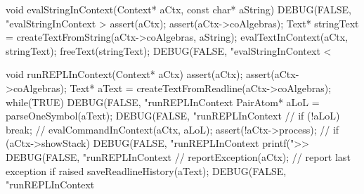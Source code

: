void evalStringInContext(Context* aCtx, const char* aString) {
  DEBUG(FALSE, "evalStringInContext > %
  assert(aCtx);
  assert(aCtx->coAlgebras);
  Text* stringText = createTextFromString(aCtx->coAlgebras, aString);
  evalTextInContext(aCtx, stringText);
  freeText(stringText);
  DEBUG(FALSE, "evalStringInContext < %
}

void runREPLInContext(Context* aCtx) {
  assert(aCtx);
  assert(aCtx->coAlgebras);
  Text* aText = createTextFromReadline(aCtx->coAlgebras);
  while(TRUE) {
    DEBUG(FALSE, "runREPLInContext %
    PairAtom* aLoL = parseOneSymbol(aText);
    DEBUG(FALSE, "runREPLInContext %
    //
    if (!aLoL) break;
    //
    evalCommandInContext(aCtx, aLoL);
    assert(!aCtx->process);
    //
    if (aCtx->showStack) {
      DEBUG(FALSE, "runREPLInContext %
      printf(">>%
      DEBUG(FALSE, "runREPLInContext %
    }
    //
    reportException(aCtx); // report last exception if raised
  }
  saveReadlineHistory(aText);
  DEBUG(FALSE, "runREPLInContext %
}

\stopCCode

\stopJoyLoLWord

\stopJoyLoLCoAlg
